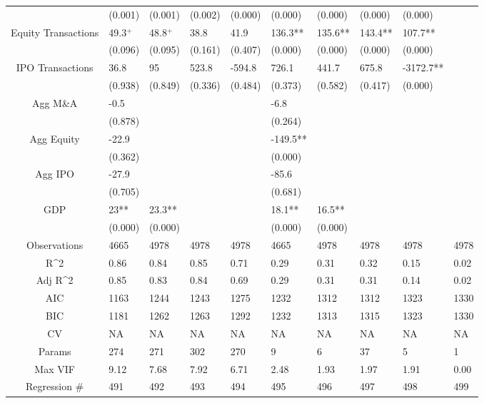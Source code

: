 \documentclass{article}
\begin{document}
\begin{table}[H]
\begin{tabular}{|clllllllll|}
   & (0.001) & (0.001) & (0.002) & (0.000) & (0.000) & (0.000) & (0.000) & (0.000) &  \\
  Equity Transactions & 49.3$^{+}$ & 48.8$^{+}$ & 38.8 & 41.9 & 136.3** & 135.6** & 143.4** & 107.7** &  \\
   & (0.096) & (0.095) & (0.161) & (0.407) & (0.000) & (0.000) & (0.000) & (0.000) &  \\
  IPO Transactions & 36.8 & 95 & 523.8 & -594.8 & 726.1 & 441.7 & 675.8 & -3172.7** &  \\
   & (0.938) & (0.849) & (0.336) & (0.484) & (0.373) & (0.582) & (0.417) & (0.000) &  \\
  Agg M\&A & -0.5 &  &  &  & -6.8 &  &  &  &  \\
   & (0.878) &  &  &  & (0.264) &  &  &  &  \\
  Agg Equity & -22.9 &  &  &  & -149.5** &  &  &  &  \\
   & (0.362) &  &  &  & (0.000) &  &  &  &  \\
  Agg IPO & -27.9 &  &  &  & -85.6 &  &  &  &  \\
   & (0.705) &  &  &  & (0.681) &  &  &  &  \\
  GDP & 23** & 23.3** &  &  & 18.1** & 16.5** &  &  &  \\
   & (0.000) & (0.000) &  &  & (0.000) & (0.000) &  &  &  \\
  \hline
 Observations & 4665 & 4978 & 4978 & 4978 & 4665 & 4978 & 4978 & 4978 & 4978 \\
  R^2 & 0.86 & 0.84 & 0.85 & 0.71 & 0.29 & 0.31 & 0.32 & 0.15 & 0.02 \\
  Adj R^2 & 0.85 & 0.83 & 0.84 & 0.69 & 0.29 & 0.31 & 0.31 & 0.14 & 0.02 \\
  AIC & 1163 & 1244 & 1243 & 1275 & 1232 & 1312 & 1312 & 1323 & 1330 \\
  BIC & 1181 & 1262 & 1263 & 1292 & 1232 & 1313 & 1315 & 1323 & 1330 \\
  CV & NA & NA & NA & NA & NA & NA & NA & NA & NA \\
  Params & 274 & 271 & 302 & 270 & 9 & 6 & 37 & 5 & 1 \\
  Max VIF & 9.12 & 7.68 & 7.92 & 6.71 & 2.48 & 1.93 & 1.97 & 1.91 & 0.00 \\
  Regression \# & 491 & 492 & 493 & 494 & 495 & 496 & 497 & 498 & 499 \\
   \hline
\end{tabular}

\end{table}
\end{document}
